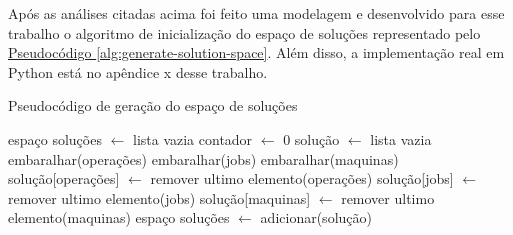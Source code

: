 Após as análises citadas acima foi feito uma modelagem e desenvolvido para esse trabalho o algoritmo de inicialização do espaço de soluções representado pelo 
\hyperref[alg:generate-solution-space]{Pseudocódigo \ref{alg:generate-solution-space}}.
Além disso, a implementação real em Python está no apêndice x desse trabalho.\\
\begin{algorithm}
\caption{Pseudocódigo de geração do espaço de soluções}\label{alg:generate-solution-space}
\begin{algorithmic}
\State espaço soluções $\gets$ lista vazia
\State contador  $\gets$ 0
  \State solução $\gets$ lista vazia
  \State embaralhar(operações)
  \State embaralhar(jobs)
  \State embaralhar(maquinas)
  \State solução[operações] $\gets$ remover ultimo elemento(operações)
  \State solução[jobs] $\gets$ remover ultimo elemento(jobs)
  \State solução[maquinas] $\gets$ remover ultimo elemento(maquinas)
  \State espaço soluções $\gets$ adicionar(solução)
\EndWhile
\end{algorithmic}
\end{algorithm}
